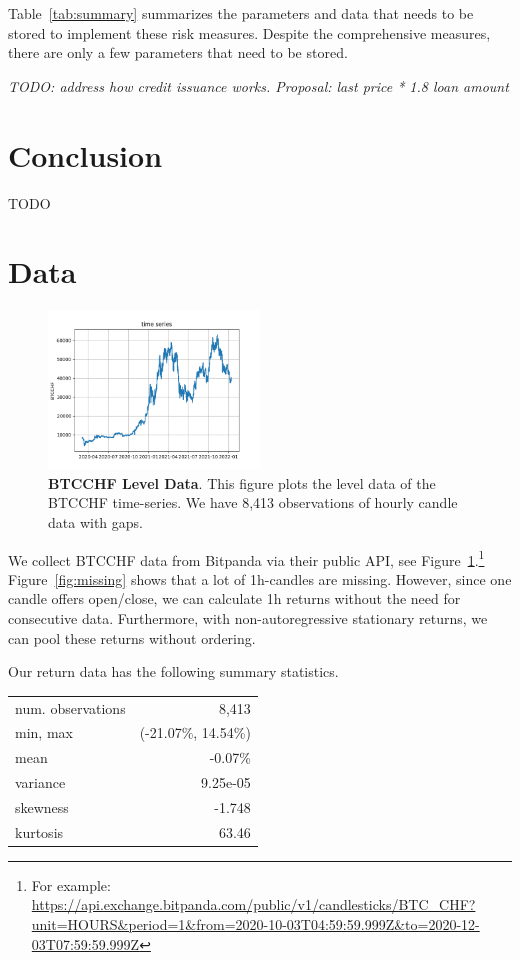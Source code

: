 \documentclass[english,11pt]{article}
\begin{document}
Table~\ref{tab:summary} summarizes the parameters and data that needs to be
stored to implement these risk measures. Despite the comprehensive
measures, there are only a few parameters that need to be stored.

\emph{TODO: address how credit issuance works. Proposal: last price * 1.8 loan amount}
\clearpage
\section{Conclusion}
TODO

\newpage



\clearpage
\appendix
\section{Data}
\begin{figure}[h]
    \center
    \includegraphics[width=0.5\textwidth]{time_series.png}
    \caption{\textbf{BTCCHF Level Data}. This figure plots
    the level data of the BTCCHF time-series.
    We have 8,413 observations of hourly candle data with gaps.}\label{fig:timeseries}
\end{figure}

We collect BTCCHF data from Bitpanda via their public 
API, see Figure~\ref{fig:timeseries}.\footnote{For example: \url{https://api.exchange.bitpanda.com/public/v1/candlesticks/BTC_CHF?unit=HOURS&period=1&from=2020-10-03T04:59:59.999Z&to=2020-12-03T07:59:59.999Z}}
Figure~\ref{fig:missing} shows that a lot of 1h-candles are missing.
However, since one candle offers open/close, we can calculate 1h returns without
the need for consecutive data. Furthermore, with non-autoregressive stationary returns,
we can pool these returns without ordering.

Our return data has the following summary statistics.
\begin{center}
\begin{tabular}{lr}
\hline
num. observations & 8,413\\
min, max &(-21.07\%, 14.54\%) \\
mean & -0.07\% \\
variance & 9.25e-05 \\ 
skewness & -1.748 \\
kurtosis & 63.46 \\
\hline
\end{tabular}
\end{center}
\end{document}
